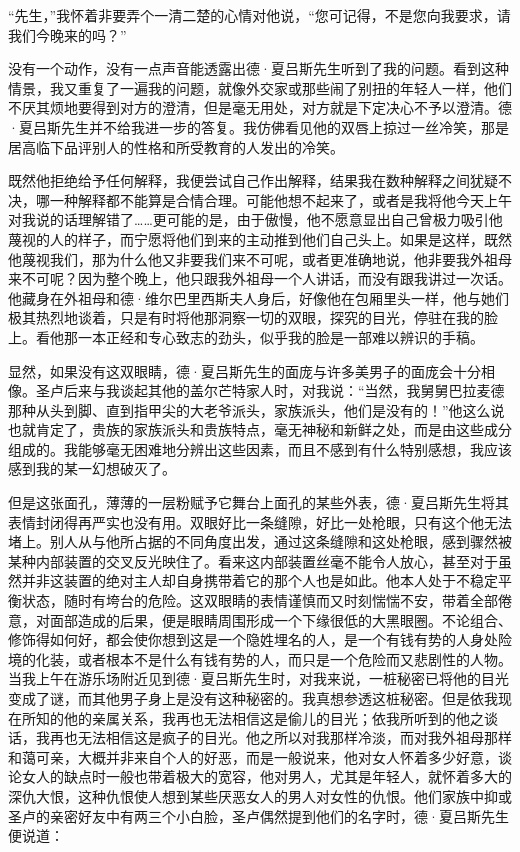 \par “先生，”我怀着非要弄个一清二楚的心情对他说，“您可记得，不是您向我要求，请我们今晚来的吗？”
\par 没有一个动作，没有一点声音能透露出德·夏吕斯先生听到了我的问题。看到这种情景，我又重复了一遍我的问题，就像外交家或那些闹了别扭的年轻人一样，他们不厌其烦地要得到对方的澄清，但是毫无用处，对方就是下定决心不予以澄清。德·夏吕斯先生并不给我进一步的答复。我仿佛看见他的双唇上掠过一丝冷笑，那是居高临下品评别人的性格和所受教育的人发出的冷笑。
\par 既然他拒绝给予任何解释，我便尝试自己作出解释，结果我在数种解释之间犹疑不决，哪一种解释都不能算是合情合理。可能他想不起来了，或者是我将他今天上午对我说的话理解错了……更可能的是，由于傲慢，他不愿意显出自己曾极力吸引他蔑视的人的样子，而宁愿将他们到来的主动推到他们自己头上。如果是这样，既然他蔑视我们，那为什么他又非要我们来不可呢，或者更准确地说，他非要我外祖母来不可呢？因为整个晚上，他只跟我外祖母一个人讲话，而没有跟我讲过一次话。他藏身在外祖母和德·维尔巴里西斯夫人身后，好像他在包厢里头一样，他与她们极其热烈地谈着，只是有时将他那洞察一切的双眼，探究的目光，停驻在我的脸上。看他那一本正经和专心致志的劲头，似乎我的脸是一部难以辨识的手稿。
\par 显然，如果没有这双眼睛，德·夏吕斯先生的面庞与许多美男子的面庞会十分相像。圣卢后来与我谈起其他的盖尔芒特家人时，对我说：“当然，我舅舅巴拉麦德那种从头到脚、直到指甲尖的大老爷派头，家族派头，他们是没有的！”他这么说也就肯定了，贵族的家族派头和贵族特点，毫无神秘和新鲜之处，而是由这些成分组成的。我能够毫无困难地分辨出这些因素，而且不感到有什么特别感想，我应该感到我的某一幻想破灭了。
\par 但是这张面孔，薄薄的一层粉赋予它舞台上面孔的某些外表，德·夏吕斯先生将其表情封闭得再严实也没有用。双眼好比一条缝隙，好比一处枪眼，只有这个他无法堵上。别人从与他所占据的不同角度出发，通过这条缝隙和这处枪眼，感到骤然被某种内部装置的交叉反光映住了。看来这内部装置丝毫不能令人放心，甚至对于虽然并非这装置的绝对主人却自身携带着它的那个人也是如此。他本人处于不稳定平衡状态，随时有垮台的危险。这双眼睛的表情谨慎而又时刻惴惴不安，带着全部倦意，对面部造成的后果，便是眼睛周围形成一个下缘很低的大黑眼圈。不论组合、修饰得如何好，都会使你想到这是一个隐姓埋名的人，是一个有钱有势的人身处险境的化装，或者根本不是什么有钱有势的人，而只是一个危险而又悲剧性的人物。当我上午在游乐场附近见到德·夏吕斯先生时，对我来说，一桩秘密已将他的目光变成了谜，而其他男子身上是没有这种秘密的。我真想参透这桩秘密。但是依我现在所知的他的亲属关系，我再也无法相信这是偷儿的目光；依我所听到的他之谈话，我再也无法相信这是疯子的目光。他之所以对我那样冷淡，而对我外祖母那样和蔼可亲，大概并非来自个人的好恶，而是一般说来，他对女人怀着多少好意，谈论女人的缺点时一般也带着极大的宽容，他对男人，尤其是年轻人，就怀着多大的深仇大恨，这种仇恨使人想到某些厌恶女人的男人对女性的仇恨。他们家族中抑或圣卢的亲密好友中有两三个小白脸，圣卢偶然提到他们的名字时，德·夏吕斯先生便说道：
